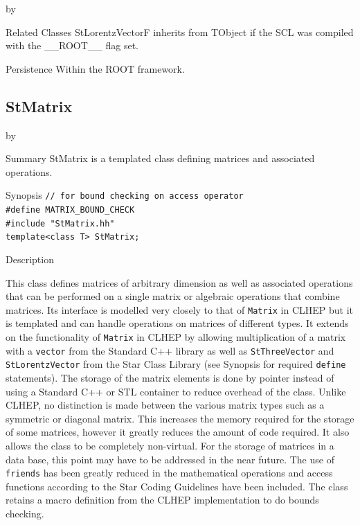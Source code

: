 \documentclass[twoside]{article}
\newcommand{\name}[1]{\textsf{#1}}%
\newcommand{\comp}[1]{\texttt{#1}}%
\newcommand{\entrylabel}[1]{\mbox{\textbf{{#1}}}\hfil}%
\newenvironment{entry}
{\begin{list}{}%
    {\renewcommand{\makelabel}{\entrylabel}%
     \setlength{\labelwidth}{90pt}%
     \setlength{\leftmargin}{\labelwidth}
     \advance\leftmargin by \labelsep%
      }%
    }%
  {\end{list}}
\newcommand{\Entrylabel}[1]%
{\raisebox{0pt}[1ex][0pt]{\makebox[\labelwidth][l]%
    {\parbox[t]{\labelwidth}{\hspace{0pt}\textbf{{#1}}}}}}
\newenvironment{Entry}%
{\renewcommand{\entrylabel}{\Entrylabel}\begin{entry}}%
  {\end{entry}}
\begin{document}
\begin{description}
\begin{Entry}
\item[Related Classes]
    StLorentzVectorF inherits from TObject 
    if the SCL was compiled with the \name{\_\_ROOT\_\_} flag set.
    
\item[Persistence]
    Within the ROOT framework.

\end{Entry}

\clearpage

%
%
\subsection{StMatrix } \label{StMatrix}
\begin{Entry}
\item[Summary]
    StMatrix is a templated class defining
    matrices and associated operations.

\item[Synopsis]
  \verb+// for bound checking on access operator+\\
  \verb+#define MATRIX_BOUND_CHECK+ \\
  \verb+#include "StMatrix.hh"+ \\
  \verb+template<class T> StMatrix;+
  
    
\item[Description]   
    
    This class defines matrices of arbitrary dimension as well as
    associated operations that can be performed on a
    single matrix or algebraic operations that combine matrices.
    Its interface is modelled very closely to that of
    \comp{Matrix} in CLHEP  but it is templated and
    can handle operations on matrices of different types.
    It extends on the functionality of \comp{Matrix} in CLHEP
    by allowing multiplication of a matrix with
    a \comp{vector}  from the Standard C++ library
    as well as \comp{StThreeVector} 
    and \comp{StLorentzVector}  from the
    Star Class Library (see Synopsis for required \comp{define} statements).
    The storage of the matrix elements is done
    by pointer instead of using a Standard C++ or STL container to
    reduce overhead of the class.  Unlike CLHEP, no distinction is made
    between the various matrix types such as a symmetric or diagonal
    matrix.  This increases the memory required for the storage
    of some matrices, however it greatly reduces the amount of code required.
    It also allows the class to be completely non-virtual.
    For the storage of matrices in a data base, this point may have to be
    addressed in the near future.
    The use of \comp{friends} has been greatly reduced in the mathematical
    operations and access functions according to the Star Coding Guidelines
     have been included.  The class
    retains a macro definition from the CLHEP implementation to do bounds
    checking.
    

\end{Entry}
\end{description}
\end{document}
